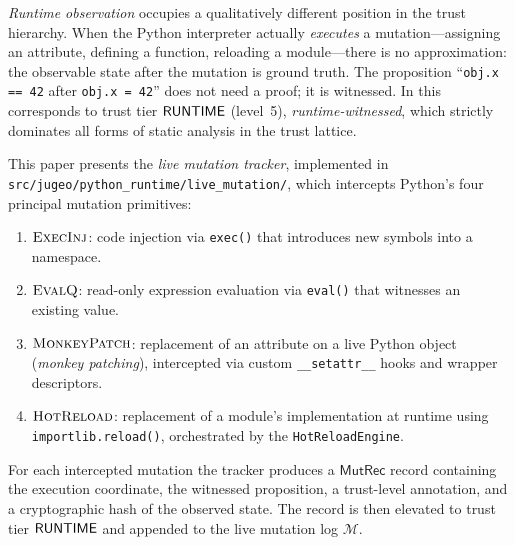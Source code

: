 \documentclass[11pt]{article}
\newcommand{\MutR}{\mathsf{MutRec}}              %
\newcommand{\ExecInj}{\textsc{ExecInj}}          %
\newcommand{\EvalQ}{\textsc{EvalQ}}              %
\newcommand{\MPatch}{\textsc{MonkeyPatch}}       %
\newcommand{\HotRel}{\textsc{HotReload}}         %
\newcommand{\MutLog}{\mathcal{M}}                %
\begin{document}
\emph{Runtime observation} occupies a qualitatively different position
in the trust hierarchy.  When the Python interpreter actually
\emph{executes} a mutation---assigning an attribute, defining a
function, reloading a module---there is no approximation: the
observable state after the mutation is ground truth.  The proposition
``\texttt{obj.x == 42} after \texttt{obj.x = 42}'' does not need a
proof; it is witnessed.  In \JuGeo{} this corresponds to trust tier
$\mathsf{RUNTIME}$ (level~5), \emph{runtime-witnessed}, which strictly
dominates all forms of static analysis in the trust lattice.

This paper presents the \emph{live mutation tracker}, implemented in
\texttt{src/jugeo/python\_runtime/live\_mutation/}, which intercepts
Python's four principal mutation primitives:
\begin{enumerate}[label=\textbf{M\arabic*}.]
\item $\ExecInj$: code injection via \texttt{exec()} that introduces
      new symbols into a namespace.
\item $\EvalQ$: read-only expression evaluation via \texttt{eval()}
      that witnesses an existing value.
\item $\MPatch$: replacement of an attribute on a live Python object
      (\emph{monkey patching}), intercepted via custom
      \texttt{\_\_setattr\_\_} hooks and wrapper descriptors.
\item $\HotRel$: replacement of a module's implementation at runtime
      using \texttt{importlib.reload()}, orchestrated by the
      \texttt{HotReloadEngine}.
\end{enumerate}

For each intercepted mutation the tracker produces a
$\MutR$ record containing the execution coordinate, the witnessed
proposition, a trust-level annotation, and a cryptographic hash of
the observed state.  The record is then elevated to trust tier
$\mathsf{RUNTIME}$ and appended to the live mutation log $\MutLog$.
\end{document}
